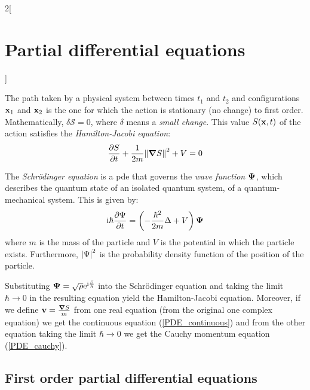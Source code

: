 \documentclass[../../../main_math.tex]{subfiles}
\begin{document}
\begin{multicols}{2}[\section{Partial differential equations}]
  \begin{proposition}
    The path taken by a physical system between times $t_1$ and $t_2$ and configurations $\boldsymbol{\mathrm{x}}_1$ and $\boldsymbol{\mathrm{x}}_2$ is the one for which the action is stationary (no change) to first order. Mathematically, $\delta \mathcal{S}=0$, where $\delta$ means a \emph{small change}. This value $S(\boldsymbol{\mathrm{x}},t)$ of the action satisfies the \emph{Hamilton-Jacobi equation}: $$\pdv{S}{t}+\frac{1}{2m}{\left\|\grad S\right\|}^2+V=0$$
  \end{proposition}
  \begin{proposition}
    The \emph{Schrödinger equation} is a pde that governs the \emph{wave function} $\boldsymbol{\mathrm{\Psi}}$, which describes the quantum state of an isolated quantum system, of a quantum-mechanical system. This is given by: $$\mathrm{i} \hbar\pdv{\Psi}{t}=\left(-\frac{\hbar^2}{2m}\Delta+V\right)\boldsymbol{\mathrm{\Psi}}$$ where $m$ is the mass of the particle and $V$ is the potential in which the particle exists. Furthermore, $\abs{\Psi}^2$ is the probability density function of the position of the particle.
  \end{proposition}
  \begin{proposition}
    Substituting $\boldsymbol{\mathrm{\Psi}}=\sqrt{\rho}\mathrm{e}^{\mathrm{i} \frac{S}{\hbar}}$ into the Schrödinger equation and taking the limit $\hbar\to 0$ in the resulting equation yield the Hamilton-Jacobi equation. Moreover, if we define $\boldsymbol{\mathrm{v}}=\frac{\grad{S}}{m}$ from one real equation (from the original one complex equation) we get the continuous equation (\cref{PDE_continuous}) and from the other equation taking the limit $\hbar\to 0$ we get the Cauchy momentum equation (\cref{PDE_cauchy}).
  \end{proposition}
  \subsection{First order partial differential equations}

\end{multicols}
\end{document}
